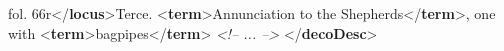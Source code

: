 \begin{shaded}
\hspace*{1em}\hspace*{1em}\hspace*{1em}\mbox{}\newline 
\hspace*{1em}\hspace*{1em}\hspace*{1em}\mbox{}\newline 
\hspace*{1em}\hspace*{1em}\hspace*{1em}\hspace*{1em}fol. 66r{</\textbf{locus}>}Terce. {<\textbf{term}>}Annunciation to the Shepherds{</\textbf{term}>},\mbox{}\newline 
\hspace*{1em}\hspace*{1em}\hspace*{1em}\hspace*{1em}\hspace*{1em}\hspace*{1em}\hspace*{1em}\hspace*{1em} one with {<\textbf{term}>}bagpipes{</\textbf{term}>}\mbox{}\newline 
\hspace*{1em}\hspace*{1em}\hspace*{1em}\mbox{}\newline 
\textit{<!-- ... -->}\mbox{}\newline 
\hspace*{1em}\hspace*{1em}\mbox{}\newline 
\hspace*{1em}\mbox{}\newline 
{}\mbox{}\newline 
{</\textbf{decoDesc}>}\end{shaded}\egroup\par 
